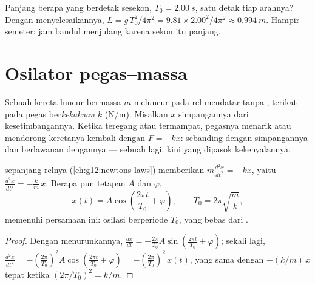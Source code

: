 \begin{example}\label{ex:g12:oscillators-and-time:seconds}
Panjang berapa yang berdetak sesekon, $T_0 = \qty{2.00}{s}$, satu detak tiap
arahnya? Dengan menyelesaikannya, $L = g\,T_0^2/4\pi^2 = 9.81 \times 2.00^2/4\pi^2 \approx
\qty{0.994}{m}$. Hampir semeter: jam bandul menjulang karena
sekon itu panjang.
\end{example}

\section{Osilator pegas--massa}

\begin{definition}\label{def:g12:oscillators-and-time:spring}
Sebuah kereta luncur bermassa $m$ meluncur pada rel mendatar tanpa ,
terikat pada pegas ber\emph{kekakuan} $k$ (\unit{N/m}). Misalkan
$x$ simpangannya dari kesetimbangannya. Ketika teregang atau termampat,
pegasnya menarik atau mendorong keretanya kembali dengan  $F = -kx$:
sebanding dengan simpangannya dan berlawanan dengannya --- sebuah  lagi, kini yang dipasok kekenyalannya.
\end{definition}

\begin{proposition}\label{prop:g12:oscillators-and-time:spring-period}
 sepanjang relnya (\cref{ch:g12:newtons-laws}) memberikan
$m \frac{d^2x}{dt^2} = -kx$, yaitu $\frac{d^2x}{dt^2} =
-\frac{k}{m}\,x$. Berapa pun tetapan $A$ dan $\varphi$,
\[
x(t) = A \cos\!\left(\frac{2\pi t}{T_0} + \varphi\right),
\qquad T_0 = 2\pi\sqrt{\frac{m}{k}},
\]
memenuhi persamaan ini: osilasi berperiode $T_0$, yang bebas
dari .
\end{proposition}

\begin{proof}
Dengan menurunkannya, $\frac{dx}{dt} = -\frac{2\pi}{T_0}A \sin(\frac{2\pi
t}{T_0} + \varphi)$; sekali lagi, $\frac{d^2x}{dt^2} = -(\frac{2\pi}{T_0})^2
A\cos(\frac{2\pi t}{T_0} + \varphi) = -(\frac{2\pi}{T_0})^2\,x(t)$,
yang sama dengan $-(k/m)\,x$ tepat ketika $(2\pi/T_0)^2 = k/m$.
\end{proof}

